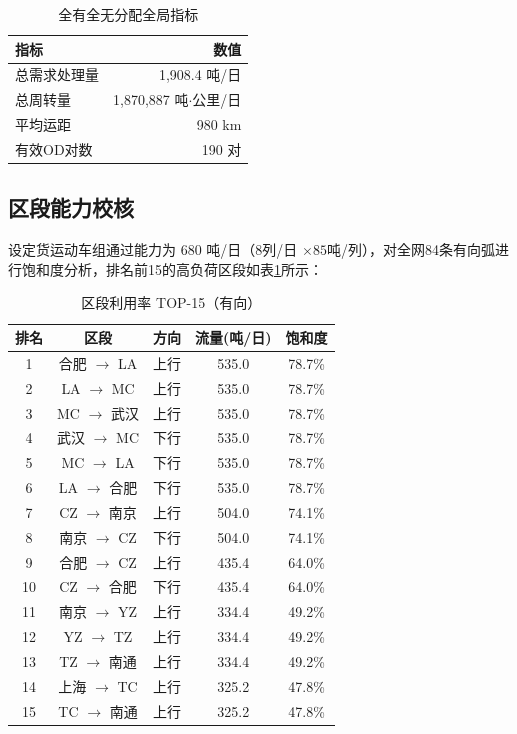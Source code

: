 \documentclass[12pt,a4paper,fontset=none]{ctexart}
\begin{document}
\begin{table}[H]
\centering
\caption{全有全无分配全局指标}
\begin{tabular}{lr}
\toprule
\textbf{指标} & \textbf{数值} \\
\midrule
总需求处理量 & 1,908.4 吨/日 \\
总周转量 & 1,870,887 吨$\cdot$公里/日 \\
平均运距 & 980 km \\
有效OD对数 & 190 对 \\
\bottomrule
\end{tabular}
\end{table}

\subsection{区段能力校核}

设定货运动车组通过能力为 680 吨/日（$8$列/日 $\times 85$吨/列），对全网84条有向弧进行饱和度分析，排名前15的高负荷区段如表\ref{tab:edge_util}所示：

\begin{table}[H]
\centering
\caption{区段利用率 TOP-15（有向）}
\label{tab:edge_util}
\begin{tabular}{ccccc}
\toprule
\textbf{排名} & \textbf{区段} & \textbf{方向} & \textbf{流量(吨/日)} & \textbf{饱和度} \\
\midrule
1 & 合肥 $\to$ LA & 上行 & 535.0 & 78.7\% \\
2 & LA $\to$ MC & 上行 & 535.0 & 78.7\% \\
3 & MC $\to$ 武汉 & 上行 & 535.0 & 78.7\% \\
4 & 武汉 $\to$ MC & 下行 & 535.0 & 78.7\% \\
5 & MC $\to$ LA & 下行 & 535.0 & 78.7\% \\
6 & LA $\to$ 合肥 & 下行 & 535.0 & 78.7\% \\
7 & CZ $\to$ 南京 & 上行 & 504.0 & 74.1\% \\
8 & 南京 $\to$ CZ & 下行 & 504.0 & 74.1\% \\
9 & 合肥 $\to$ CZ & 上行 & 435.4 & 64.0\% \\
10 & CZ $\to$ 合肥 & 下行 & 435.4 & 64.0\% \\
11 & 南京 $\to$ YZ & 上行 & 334.4 & 49.2\% \\
12 & YZ $\to$ TZ & 上行 & 334.4 & 49.2\% \\
13 & TZ $\to$ 南通 & 上行 & 334.4 & 49.2\% \\
14 & 上海 $\to$ TC & 上行 & 325.2 & 47.8\% \\
15 & TC $\to$ 南通 & 上行 & 325.2 & 47.8\% \\
\bottomrule
\end{tabular}
\end{table}
\end{document}
